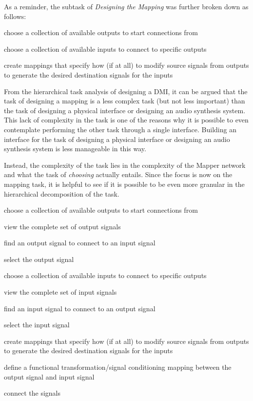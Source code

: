 As a reminder, the subtask of \emph{Designing the Mapping} was further broken down as follows:

\begin{description}
	\item choose a collection of available outputs to start connections from
	\item choose a collection of available inputs to connect to specific outputs
	\item create mappings that specify how (if at all) to modify source signals from outputs to generate the desired destination signals for the inputs
\end{description}

From the hierarchical task analysis of designing a DMI, it can be argued that the task of designing a mapping is a less complex task (but not less important) than the task of designing a physical interface or designing an audio synthesis system. This lack of complexity in the task is one of the reasons why it is possible to even contemplate performing the other task through a single interface. Building an interface for the task of designing a physical interface or designing an audio synthesis system is less manageable in this way.

Instead, the complexity of the task lies in the complexity of the Mapper network and what the task of \emph{choosing} actually entails. Since the focus is now on the mapping task, it is helpful to see if it is possible to be even more granular in the hierarchical decomposition of the task. 

\begin{description}
	\item choose a collection of available outputs to start connections from
    \begin{description}
        \item view the complete set of output signals
        \item find an output signal to connect to an input signal
        \item select the output signal
    \end{description}
	\item choose a collection of available inputs to connect to specific outputs
    \begin{description}
        \item view the complete set of input signals
        \item find an input signal to connect to an output signal
        \item select the input signal
    \end{description}
	\item create mappings that specify how (if at all) to modify source signals from outputs to generate the desired destination signals for the inputs
    \begin{description}
        \item define a functional transformation/signal conditioning mapping between the output signal and input signal 
        \item connect the signals
    \end{description}
\end{description}

